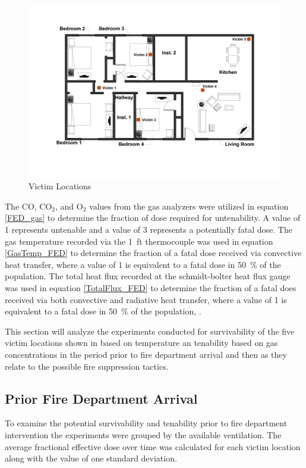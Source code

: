 \documentclass[12pt,oneside]{book}
\begin{document}
\begin{figure}[H]
	\centering
	\includegraphics[width=\textwidth]{../0_Images/Victim_Locations}
	\caption{Victim Locations}
	\label{fig:vic_loc}
\end{figure}

The CO, CO$_{2}$, and O$_{2}$ values from the gas analyzers were utilized in equation \ref{FED_gas} to determine the fraction of dose required for untenability. A value of 1 represents untenable and a value of 3 represents a potentially fatal dose. The gas temperature recorded via the 1~ft thermocouple was used in equation \ref{GasTemp_FED} to determine the fraction of a fatal dose received via convective heat transfer, where a value of 1 is equivalent to a fatal dose in 50~\% of the population. The total heat flux recorded at the  schmidt-bolter heat flux gauge was used in equation \ref{TotalFlux_FED} to determine the fraction of a fatal does received via both convective and radiative heat transfer, where a value of 1 is equivalent to a fatal dose in 50~\% of the population, .  

This section will analyze the experiments conducted for survivability of the five victim locations shown in  based on temperature an tenability based on gas concentrations in the period prior to fire department arrival and then as they relate to the possible fire suppression tactics. 

\subsection{Prior Fire Department Arrival}
To examine the potential survivability and tenability prior to fire department intervention the experiments were grouped by the available ventilation. The average fractional effective dose over time was calculated for each victim location along with the value of one standard deviation. 
\end{document}
